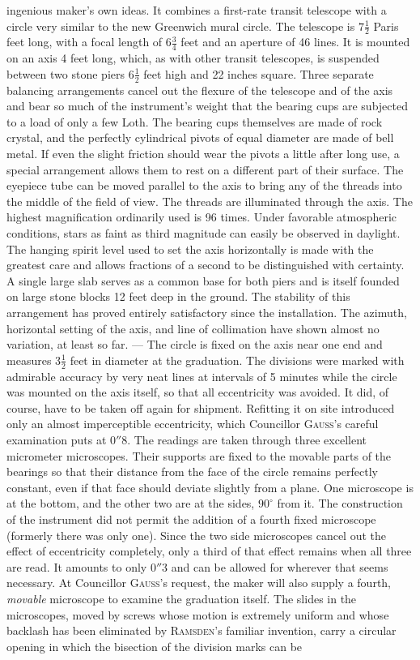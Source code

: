 ingenious maker’s own ideas. It combines a first-rate transit telescope with a circle very similar to the new Greenwich mural circle. The telescope is $7\frac{1}{2}$ Paris feet long, with a focal length of $6\frac{3}{4}$ feet and an aperture of 46 lines. It is mounted on an axis 4 feet long, which, as with other transit telescopes, is suspended between two stone piers $6\frac{1}{2}$ feet high and 22 inches square. Three separate balancing arrangements cancel out the flexure of the telescope and of the axis and bear so much of the instrument’s weight that the bearing cups are subjected to a load of only a few Loth. The bearing cups  themselves are made of rock crystal, and the perfectly cylindrical pivots of equal diameter are made of bell metal. If even the slight friction should wear the pivots a little after long use, a special arrangement allows them to rest on a different part of their surface. The eyepiece tube can be moved parallel to the axis to bring any of the threads into the middle of the field of view. The threads are illuminated through the axis. The highest magnification ordinarily used is 96 times. Under favorable atmospheric conditions, stars as faint as third magnitude can easily be observed in daylight. The hanging spirit level used to set the axis horizontally is made with the greatest care and allows fractions of a second to be distinguished with certainty. A single large slab serves as a common base for both piers and is itself founded on large stone blocks 12 feet deep in the ground. The stability of this arrangement has proved entirely satisfactory since the installation. The azimuth, horizontal setting of the axis, and line of collimation have shown almost no variation, at least so far. --- The circle is fixed on the axis near one end and measures $3\frac{1}{2}$ feet in diameter at the graduation. The divisions were marked with admirable accuracy by very neat lines at intervals of 5 minutes while the circle was mounted on the axis itself, so that all eccentricity was avoided. It did, of course, have to be taken off again for shipment. Refitting it on site introduced only an almost imperceptible eccentricity, which Councillor \textsc{Gauss}’s careful examination puts at $0''8$. The readings are taken through three excellent micrometer microscopes. Their supports are fixed to the movable parts of the bearings so that their distance from the face of the circle remains perfectly constant, even if that face should deviate slightly from a plane. One microscope is at the bottom, and the other two are at the sides, $90^\circ$ from it. The construction of the instrument did not permit the addition of a fourth fixed microscope (formerly there was only one). Since the two side microscopes cancel out the effect of eccentricity completely, only a third of that effect remains when all three are read. It amounts to only $0''3$ and can be allowed for wherever that seems necessary. At Councillor \textsc{Gauss}’s request, the maker will also supply a fourth, \emph{movable} microscope to examine the graduation itself. The slides in the microscopes, moved by screws whose motion is extremely uniform and whose backlash has been eliminated by \textsc{Ramsden}’s familiar invention, carry a circular opening in which the bisection of the division marks can be 